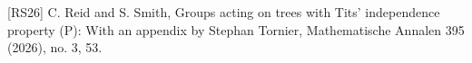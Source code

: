 \documentclass[preview]{standalone}
\begin{document}
\begin{center}
[RS26] C. Reid and S. Smith, Groups acting on trees with Tits’ independence property (P): With an appendix by Stephan Tornier, Mathematische Annalen 395 (2026), no. 3, 53.
\end{center}
\end{document}

